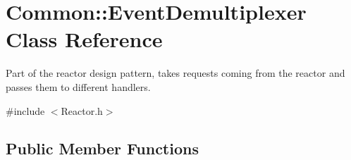 \hypertarget{class_common_1_1_event_demultiplexer}{\section{Common\-:\-:Event\-Demultiplexer Class Reference}
\label{class_common_1_1_event_demultiplexer}
}


Part of the reactor design pattern, takes requests coming from the reactor and passes them to different handlers.  




{\ttfamily \#include $<$Reactor.\-h$>$}

\subsection*{Public Member Functions}
